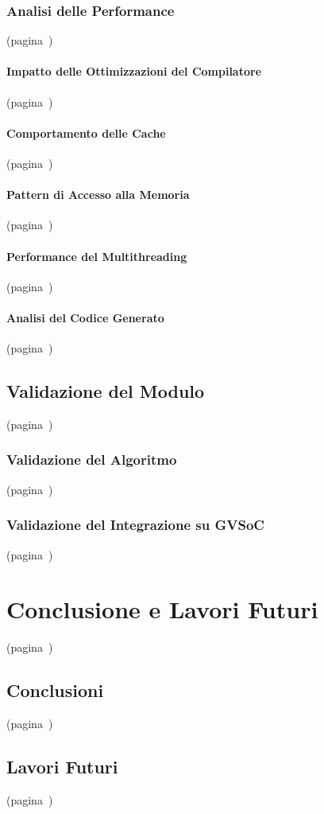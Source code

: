 \subsection{Analisi delle Performance}(pagina~\pageref{sec:data_anal})
\subsubsection{Impatto delle Ottimizzazioni del Compilatore}(pagina~\pageref{sec:compiler_impact})
\subsubsection{Comportamento delle Cache}(pagina~\pageref{sec:cache_beh})
\subsubsection{Pattern di Accesso alla Memoria}(pagina~\pageref{sec:mem_access})
\subsubsection{Performance del Multithreading}(pagina~\pageref{sec:multi_perf})
\subsubsection{Analisi del Codice Generato}(pagina~\pageref{sec:codegen_analysis})
\section{Validazione del Modulo}(pagina~\pageref{sec:mod_val})
\subsection{Validazione del Algoritmo}(pagina~\pageref{sec:alg_val})
\subsection{Validazione del Integrazione su GVSoC}(pagina~\pageref{sec:gvsoc_val})

\chapter{Conclusione e Lavori Futuri} (pagina~\pageref{chap:conclusion})
\section{Conclusioni}(pagina~\pageref{sec:res_sum})
\section{Lavori Futuri}(pagina~\pageref{sec:future_work})